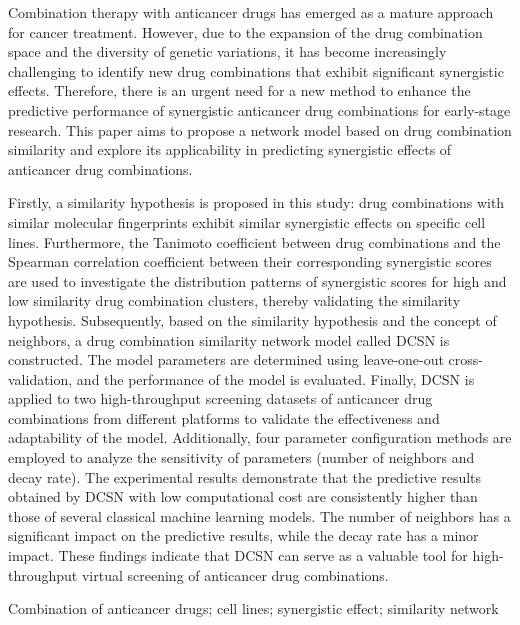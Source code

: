 \begin{englishabstract}
Combination therapy with anticancer drugs has emerged as a mature approach for cancer treatment. However, due to the expansion of the drug combination space and the diversity of genetic variations, it has become increasingly challenging to identify new drug combinations that exhibit significant synergistic effects. Therefore, there is an urgent need for a new method to enhance the predictive performance of synergistic anticancer drug combinations for early-stage research. This paper aims to propose a network model based on drug combination similarity and explore its applicability in predicting synergistic effects of anticancer drug combinations.

Firstly, a similarity hypothesis is proposed in this study: drug combinations with similar molecular fingerprints exhibit similar synergistic effects on specific cell lines. Furthermore, the Tanimoto coefficient between drug combinations and the Spearman correlation coefficient between their corresponding synergistic scores are used to investigate the distribution patterns of synergistic scores for high and low similarity drug combination clusters, thereby validating the similarity hypothesis. Subsequently, based on the similarity hypothesis and the concept of neighbors, a drug combination similarity network model called DCSN is constructed. The model parameters are determined using leave-one-out cross-validation, and the performance of the model is evaluated. Finally, DCSN is applied to two high-throughput screening datasets of anticancer drug combinations from different platforms to validate the effectiveness and adaptability of the model. Additionally, four parameter configuration methods are employed to analyze the sensitivity of parameters (number of neighbors and decay rate). The experimental results demonstrate that the predictive results obtained by DCSN with low computational cost are consistently higher than those of several classical machine learning models. The number of neighbors has a significant impact on the predictive results, while the decay rate has a minor impact. These findings indicate that DCSN can serve as a valuable tool for high-throughput virtual screening of anticancer drug combinations.
\end{englishabstract}

\begin{englishkeywords}
Combination of anticancer drugs; cell lines; synergistic effect; similarity network
\end{englishkeywords}

\cleardoublepage